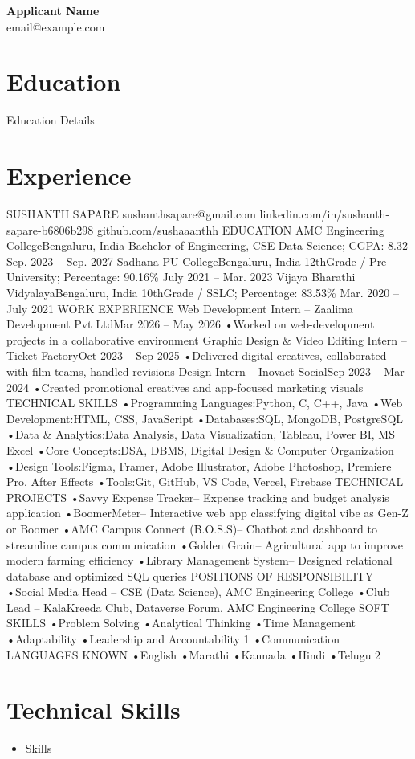 \documentclass[11pt,a4paper]{article}
\begin{document}
\pagestyle{empty}

{\Huge \textcolor{primary}{\textbf{Applicant Name}}} \\
\vspace{1mm}
{\large email@example.com}
\vspace{4mm}

\section*{\textcolor{primary}{Education}}
\noindent Education Details

\section*{\textcolor{primary}{Experience}}
\noindent SUSHANTH SAPARE sushanthsapare@gmail.com linkedin.com/in/sushanth-sapare-b6806b298 github.com/sushaaanthh EDUCATION AMC Engineering CollegeBengaluru, India Bachelor of Engineering, CSE-Data Science; CGPA: 8.32 Sep. 2023 – Sep. 2027 Sadhana PU CollegeBengaluru, India 12thGrade / Pre-University; Percentage: 90.16\% July 2021 – Mar. 2023 Vijaya Bharathi VidyalayaBengaluru, India 10thGrade / SSLC; Percentage: 83.53\% Mar. 2020 – July 2021 WORK EXPERIENCE Web Development Intern – Zaalima Development Pvt LtdMar 2026 – May 2026 •Worked on web-development projects in a collaborative environment Graphic Design \& Video Editing Intern – Ticket FactoryOct 2023 – Sep 2025 •Delivered digital creatives, collaborated with film teams, handled revisions Design Intern – Inovact SocialSep 2023 – Mar 2024 •Created promotional creatives and app-focused marketing visuals TECHNICAL SKILLS •Programming Languages:Python, C, C++, Java •Web Development:HTML, CSS, JavaScript •Databases:SQL, MongoDB, PostgreSQL •Data \& Analytics:Data Analysis, Data Visualization, Tableau, Power BI, MS Excel •Core Concepts:DSA, DBMS, Digital Design \& Computer Organization •Design Tools:Figma, Framer, Adobe Illustrator, Adobe Photoshop, Premiere Pro, After Effects •Tools:Git, GitHub, VS Code, Vercel, Firebase TECHNICAL PROJECTS •Savvy Expense Tracker– Expense tracking and budget analysis application •BoomerMeter– Interactive web app classifying digital vibe as Gen-Z or Boomer •AMC Campus Connect (B.O.S.S)– Chatbot and dashboard to streamline campus communication •Golden Grain– Agricultural app to improve modern farming efficiency •Library Management System– Designed relational database and optimized SQL queries POSITIONS OF RESPONSIBILITY •Social Media Head – CSE (Data Science), AMC Engineering College •Club Lead – KalaKreeda Club, Dataverse Forum, AMC Engineering College SOFT SKILLS •Problem Solving •Analytical Thinking •Time Management •Adaptability •Leadership and Accountability 1 •Communication LANGUAGES KNOWN •English •Marathi •Kannada •Hindi •Telugu 2

\section*{\textcolor{primary}{Technical Skills}}
\begin{itemize}
    \item Skills
\end{itemize}
\end{document}
